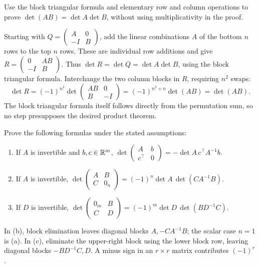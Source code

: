 \begin{problem}\label{ex:07:block-product}
Use the block triangular formula and elementary row and column
operations to prove \(\det(AB)=\det A\det B\), without using
multiplicativity in the proof.
\end{problem}
\begin{solution}
Starting with \(Q=\begin{pmatrix}A&0\\-I&B\end{pmatrix}\), add the
linear combinations \(A\) of the bottom \(n\) rows to the top \(n\)
rows. These are individual row additions and give
\(R=\begin{pmatrix}0&AB\\-I&B\end{pmatrix}\).
Thus \(\det R=\det Q=\det A\det B\), using the block triangular formula.
Interchange the two column blocks in \(R\), requiring \(n^2\) swaps:
\[
 \det R=(-1)^{n^2}
 \det\begin{pmatrix}AB&0\\B&-I\end{pmatrix}
 =(-1)^{n^2+n}\det(AB)=\det(AB).
\]
The block triangular formula itself follows directly from the permutation
sum, so no step presupposes the desired product theorem.
\end{solution}

\begin{problem}\label{ex:07:block-zero}
Prove the following formulas under the stated assumptions:
\begin{enumerate}
\item If \(A\) is invertible and \(b,c\in\mathbb R^m\),
\(\det\begin{pmatrix}A&b\\c^\top&0\end{pmatrix}
=-\det A\,c^\top A^{-1}b\).
\item If \(A\) is invertible,
\(\det\begin{pmatrix}A&B\\C&0_n\end{pmatrix}
=(-1)^n\det A\,\det(CA^{-1}B)\).
\item If \(D\) is invertible,
\(\det\begin{pmatrix}0_m&B\\C&D\end{pmatrix}
=(-1)^m\det D\,\det(BD^{-1}C)\).
\end{enumerate}
\end{problem}
\begin{solution}
In (b), block elimination leaves diagonal blocks \(A,-CA^{-1}B\);
the scalar case \(n=1\) is (a). In (c), eliminate the upper-right block
using the lower block row, leaving diagonal blocks \(-BD^{-1}C,D\).
A minus sign in an \(r\times r\) matrix contributes \((-1)^r\).
\end{solution}

